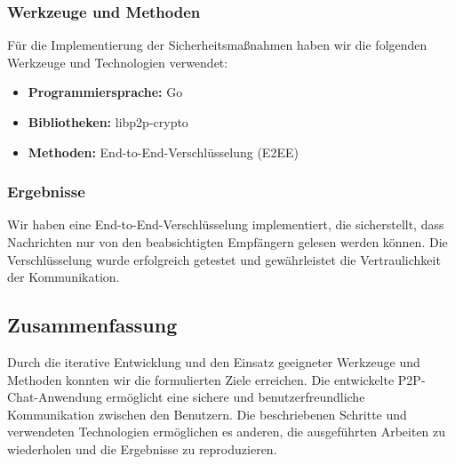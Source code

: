 \subsubsection{Werkzeuge und Methoden}
Für die Implementierung der Sicherheitsmaßnahmen haben wir die folgenden Werkzeuge und Technologien verwendet:
\begin{itemize}
    \item \textbf{Programmiersprache:} Go
    \item \textbf{Bibliotheken:} libp2p-crypto
    \item \textbf{Methoden:} End-to-End-Verschlüsselung (E2EE)
\end{itemize}

\subsubsection{Ergebnisse}
Wir haben eine End-to-End-Verschlüsselung implementiert, die sicherstellt, dass Nachrichten nur von den beabsichtigten Empfängern gelesen werden können. Die Verschlüsselung wurde erfolgreich getestet und gewährleistet die Vertraulichkeit der Kommunikation.

\subsection{Zusammenfassung}
Durch die iterative Entwicklung und den Einsatz geeigneter Werkzeuge und Methoden konnten wir die formulierten Ziele erreichen. Die entwickelte P2P-Chat-Anwendung ermöglicht eine sichere und benutzerfreundliche Kommunikation zwischen den Benutzern. Die beschriebenen Schritte und verwendeten Technologien ermöglichen es anderen, die ausgeführten Arbeiten zu wiederholen und die Ergebnisse zu reproduzieren.

\newpage
